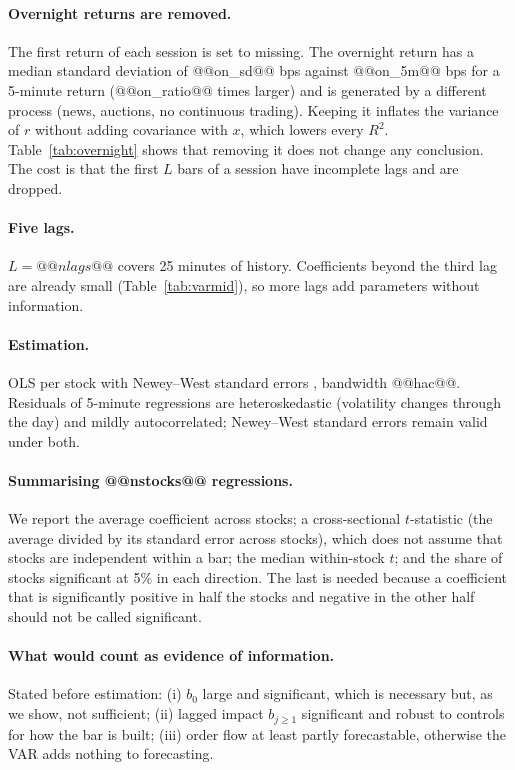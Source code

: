 \documentclass[11pt,a4paper]{article}
\begin{document}
\paragraph{Overnight returns are removed.} The first return of each session is set to missing. The
overnight return has a median standard deviation of @@on_sd@@ bps against @@on_5m@@ bps for a 5-minute return
(@@on_ratio@@ times larger) and is generated by a different process
(news, auctions, no continuous trading). Keeping it inflates the variance of $r$ without adding
covariance with $x$, which lowers every $R^2$. Table~\ref{tab:overnight} shows that removing it does not
change any conclusion. The cost is that the first $L$ bars of a session have incomplete lags and are
dropped.

\paragraph{Five lags.} $L=@@nlags@@$ covers 25 minutes of history. Coefficients beyond the third lag are
already small (Table~\ref{tab:varmid}), so more lags add parameters without information.

\paragraph{Estimation.} OLS per stock with Newey--West standard errors \citep{newey1987}, bandwidth
@@hac@@. Residuals of 5-minute regressions are heteroskedastic (volatility changes through the day) and
mildly autocorrelated; Newey--West standard errors remain valid under both.

\paragraph{Summarising @@nstocks@@ regressions.} We report the average coefficient across stocks; a
cross-sectional $t$-statistic (the average divided by its standard error across stocks), which does
not assume that stocks are independent within a bar; the median within-stock $t$; and the share of
stocks significant at 5\% in each direction. The last is needed because a coefficient that is
significantly positive in half the stocks and negative in the other half should not be called
significant.

\paragraph{What would count as evidence of information.} Stated before estimation: (i) $b_0$ large
and significant, which is necessary but, as we show, not sufficient; (ii) lagged impact $b_{j\ge1}$
significant and robust to controls for how the bar is built; (iii) order flow at least partly
forecastable, otherwise the VAR adds nothing to forecasting.
\end{document}
